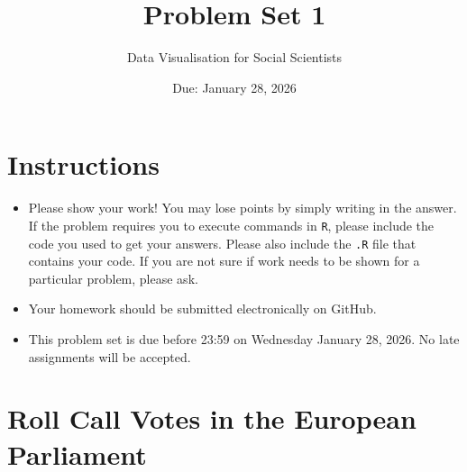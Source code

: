 \documentclass[12pt,letterpaper]{article}
\title{Problem Set 1}
\date{Due: January 28, 2026}
\author{Data Visualisation for Social Scientists}
\begin{document}
	\maketitle
	
	\section*{Instructions}
	\begin{itemize}
	\item Please show your work! You may lose points by simply writing in the answer. If the problem requires you to execute commands in \texttt{R}, please include the code you used to get your answers. Please also include the \texttt{.R} file that contains your code. If you are not sure if work needs to be shown for a particular problem, please ask.
\item Your homework should be submitted electronically on GitHub.
\item This problem set is due before 23:59 on Wednesday January 28, 2026. No late assignments will be accepted.
	\end{itemize}
	
	\vspace{1cm}
	\section*{Roll Call Votes in the European Parliament}
\end{document}
